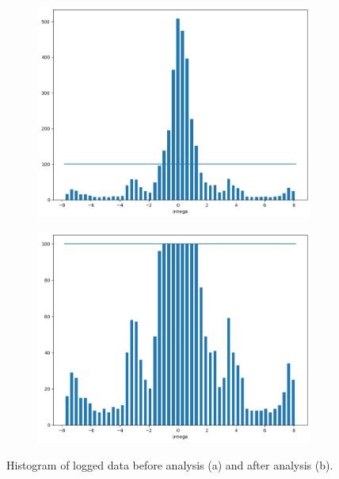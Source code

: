 \documentclass[conference]{IEEEtran}
\begin{document}
\begin{figure}[h]
	\begin{subfigure}{.475\columnwidth}
    	\centering
    	\includegraphics[width=1\columnwidth]{h1}
    	\caption{}
    	\label{fig:cnn-data-hist1}
    \end{subfigure}
    \begin{subfigure}{.475\columnwidth}
    	\centering
    	\includegraphics[width=1\columnwidth]{h2}
    	\caption{}
    	\label{fig:cnn-data-hist2}
    \end{subfigure}
    
    \caption{Histogram of logged data before analysis (a) and after analysis (b).}
    \label{fig:cnn-data-hist}
\end{figure}
\end{document}
